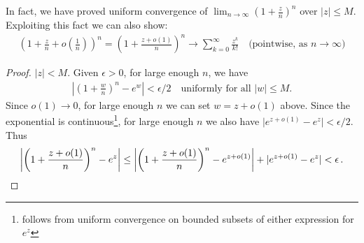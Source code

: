 \documentclass[12pt]{article}
\providecommand{\abs}[1]{\lvert#1\rvert}
\providecommand{\absW}[1]{\left\lvert#1\right\rvert}
\begin{document}
In fact, we have proved uniform convergence of $\lim_{n\to\infty} \left( 1 + \frac{z}{n} \right)^n$
over $\abs{z} \leq M$.
Exploiting this fact we can also show:
\begin{align*}
\left( 1 + \frac{z}{n} + o\left(\frac{1}{n}\right) \right)^n
= 
\left( 1 + \frac{z + o(1)}{n} \right)^n
 \to 
\sum_{k=0}^\infty \frac{z^k}{k!} \quad \textrm{(pointwise, as $n \to \infty$)}
\end{align*}

\begin{proof}
 $\abs{z} < M$.
Given $\epsilon > 0$, for large enough $n$, we have
\begin{align*}
\absW{ \left( 1 + \frac{w}{n} \right)^n - e^w } < \epsilon/2 \quad
\textrm{uniformly for all $\abs{w} \leq M$.}
\end{align*}
Since $o(1) \to 0$, for large enough $n$ we can set $w = z+o(1)$ above.
Since the exponential is continuous\footnote{follows from uniform convergence on bounded subsets of either expression for $e^z$}, for large enough $n$ we also have $\abs{e^{z+o(1)} - e^z} < \epsilon/2$.  Thus
\begin{align*}
\absW{\left( 1 + \frac{z + o(1)}{n} \right)^n - e^z}
\leq 
\absW{ \left( 1 + \frac{z + o(1)}{n} \right)^n
- e^{z+o(1)}} + \abs{e^{z+o(1)} - e^z} < \epsilon\,.
\qedhere
\end{align*}
\end{proof}
\end{document}
